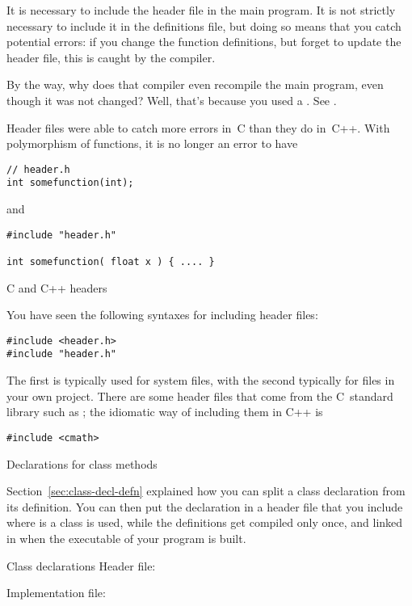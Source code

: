 It is necessary to include the header file in the main program. It is
not strictly necessary to include it in the definitions file, but
doing so means that you catch potential errors: if you change the
function definitions, but forget to update the header file, this is
caught by the compiler.


\begin{remark}
  By the way, why does that compiler even recompile the main program,
  even though it was not changed? Well, that's because you used a
  . See .
\end{remark}
\begin{remark}
  Header files were able to catch more errors in~C than they do
  in~C++. With polymorphism of functions, it is no longer an error to
  have 
\begin{lstlisting}
// header.h
int somefunction(int);
\end{lstlisting}
and
\begin{lstlisting}
#include "header.h"

int somefunction( float x ) { .... }
\end{lstlisting}
\end{remark}

 {C and C++ headers}

You have seen the following syntaxes for including header files:
\begin{lstlisting}
#include <header.h>
#include "header.h"
\end{lstlisting}
The first is typically used for system files, with the second
typically for files in your own project. There are some header files
that come from the C~standard library such as ; the
idiomatic way of including them in C++ is
\begin{lstlisting}
#include <cmath>
\end{lstlisting}

 {Declarations for class methods}
\label{sec:class-header-file}

Section~\ref{sec:class-decl-defn} explained how you can split a
class declaration from its definition.
You can then put the declaration in a header file that
you include where is a class is used,
while the definitions get compiled only once,
and linked in when the executable of your program is built.

\begin{block}{Class declarations}
  \label{sl:class-proto}
  Header file:

  Implementation file:
\end{block}

